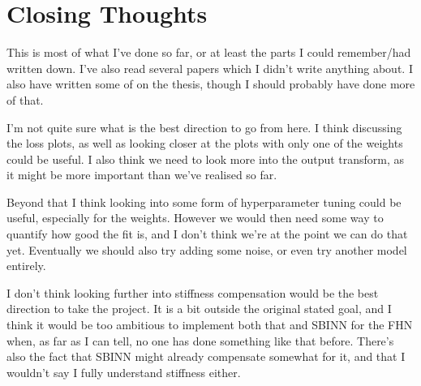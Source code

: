 \documentclass[a4paper]{article}
\begin{document}


\section{Closing Thoughts}

This is most of what I've done so far, or at least the parts I could remember/had written down. I've also read several papers which I didn't write anything about. I also have written some of on the thesis, though I should probably have done more of that.

I'm not quite sure what is the best direction to go from here. I think discussing the loss plots, as well as looking closer at the plots with only one of the weights could be useful. I also think we need to look more into the output transform, as it might be more important than we've realised so far. 

Beyond that I think looking into some form of hyperparameter tuning could be useful, especially for the weights. However we would then need some way to quantify how good the fit is, and I don't think we're at the point we can do that yet. Eventually we should also try adding some noise, or even try another model entirely.

I don't think looking further into stiffness compensation would be the best direction to take the project. It is a bit outside the original stated goal, and I think it would be too ambitious to implement both that and SBINN for the FHN when, as far as I can tell, no one has done something like that before. There's also the fact that SBINN might already compensate somewhat for it, and that I wouldn't say I fully understand stiffness either.
\end{document}
